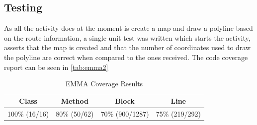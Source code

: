 \subsection{Testing}
As all the activity does at the moment is create a map and draw a polyline based on the route information, a single unit test was written which starts the activity, asserts that the map is created and that the number of coordinates used to draw the polyline are correct when compared to the ones received. The code coverage report can be seen in \autoref{tab:emma2}

\begin{table}[!ht]
	\centering
	\begin{tabular}{| c | c | c | c |}
		\hline
		\textbf{Class} & \textbf{Method} & \textbf{Block} & \textbf{Line} \\ \hline
		100\% (16/16) & 80\% (50/62) & 70\% (900/1287) & 75\% (219/292) \\
		\hline
	\end{tabular}
	\caption{EMMA Coverage Results}
	\label{tab:emma2}
\end{table}
